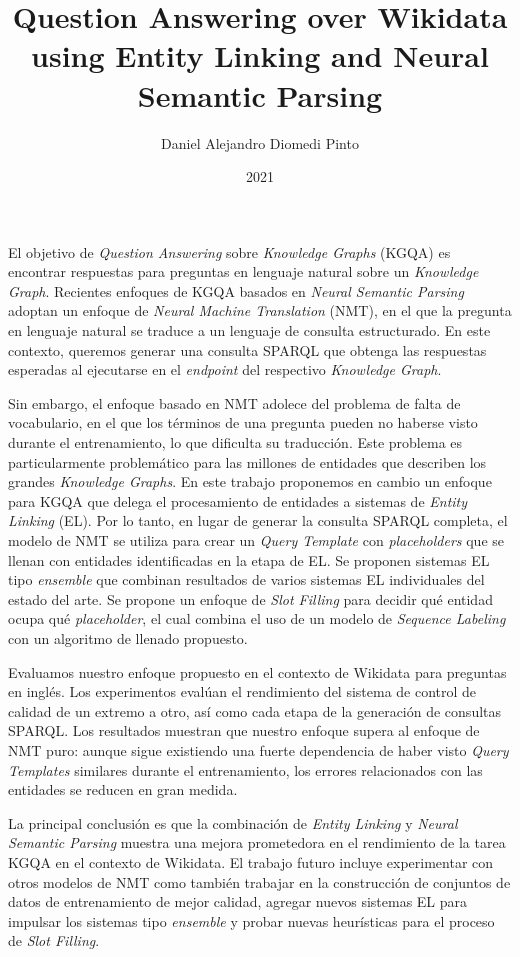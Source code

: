 \documentclass[upright, contnum]{umemoria}
\author{Daniel Alejandro Diomedi Pinto}
\title{Question Answering over Wikidata using Entity Linking and Neural Semantic Parsing}
\date{2021}
\begin{document}
\frontmatter
\maketitle

\begin{resumen}
    {
    El objetivo de \textit{Question Answering} sobre \textit{Knowledge Graphs} (KGQA) es encontrar
    respuestas para preguntas en lenguaje natural sobre un \textit{Knowledge Graph}. Recientes enfoques 
    de KGQA basados en \textit{Neural Semantic Parsing} adoptan un enfoque de \textit{Neural 
    Machine Translation} (NMT), en el que la pregunta en lenguaje natural se traduce a un lenguaje de 
    consulta estructurado. En este contexto, queremos generar una consulta SPARQL que obtenga las 
    respuestas esperadas al ejecutarse en el \textit{endpoint} del respectivo \textit{Knowledge Graph}.

    Sin embargo, el enfoque basado en NMT adolece del problema de falta de vocabulario, en el que los 
    términos de una pregunta pueden no haberse visto durante el entrenamiento, lo que dificulta su 
    traducción. Este problema es particularmente problemático para las millones de entidades que 
    describen los grandes \textit{Knowledge Graphs}. En este trabajo proponemos en cambio un enfoque 
    para KGQA que delega el procesamiento de entidades a sistemas de \textit{Entity Linking} (EL). Por 
    lo tanto, en lugar de generar la consulta SPARQL completa, el modelo de NMT se utiliza para crear 
    un \textit{Query Template} con \textit{placeholders} que se llenan con entidades identificadas en 
    la etapa de EL. Se proponen sistemas EL tipo \textit{ensemble} que combinan resultados de varios 
    sistemas EL individuales del estado del arte. Se propone un enfoque de \textit{Slot Filling} para 
    decidir qué entidad ocupa qué \textit{placeholder}, el cual combina el uso de un modelo de 
    \textit{Sequence Labeling} con un algoritmo de llenado propuesto.

    Evaluamos nuestro enfoque propuesto en el contexto de Wikidata para preguntas en inglés. Los 
    experimentos evalúan el rendimiento del sistema de control de calidad de un extremo a otro, así 
    como cada etapa de la generación de consultas SPARQL. Los resultados muestran que nuestro enfoque 
    supera al enfoque de NMT puro: aunque sigue existiendo una fuerte dependencia de haber visto 
    \textit{Query Templates} similares durante el entrenamiento, los errores relacionados con las 
    entidades se reducen en gran medida.

    La principal conclusión es que la combinación de \textit{Entity Linking} y \textit{Neural Semantic 
    Parsing} muestra una mejora prometedora en el rendimiento de la tarea KGQA en el contexto de Wikidata. 
    El trabajo futuro incluye experimentar con otros modelos de NMT como también trabajar en la 
    construcción de conjuntos de datos de entrenamiento de mejor calidad, agregar nuevos sistemas EL para 
    impulsar los sistemas tipo \textit{ensemble} y probar nuevas heurísticas para el proceso de 
    \textit{Slot Filling}.
    }
\end{resumen}
\end{document}
